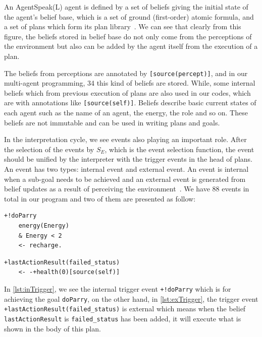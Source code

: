 An AgentSpeak(L) agent is defined by a set of beliefs giving the initial state of the agent's belief base, which is a set of ground (first-order) atomic formula, and a set of plans which form its plan library~\cite{rafael_BDIAgent_2005}.
We can see that clearly from this figure, the beliefs stored in belief base do not only come from the perceptions of the environment but also can be added by the agent itself from the execution of a plan.

The beliefs from perceptions are annotated by \texttt{[source(percept)]}, and in our multi-agent programming, 34 this kind of beliefs are stored.
While, some internal beliefs which from previous execution of plans are also used in our codes, which are with annotations like \texttt{[source(self)]}.
Beliefs describe basic current states of each agent such as the name of an agent, the energy, the role and so on.
These beliefs are not immutable and can be used in writing plans and goals.

In the interpretation cycle, we see events also playing an important role.
After the selection of the events by $S_E$, which is the event selection function, the event should be unified by the interpreter with the trigger events in the head of plans.
An event has two types: internal event and external event.
An event is internal when a sub-goal needs to be achieved and an external event is generated from belief updates as a result of perceiving the environment~\cite{rafael_Javabased_2007}.
We have 88 events in total in our program and two of them are presented as follow:

\begin{lstlisting}[caption={Internal Trigger Event.},label={lst:inTrigger}]
  +!doParry
    energy(Energy)
    & Energy < 2
    <- recharge.
\end{lstlisting}

\begin{lstlisting}[caption={External Trigger Event.},label={lst:exTrigger}]
  +lastActionResult(failed_status)
    <- -+health(0)[source(self)]
\end{lstlisting}

In \autoref{lst:inTrigger}, we see the internal trigger event \texttt{+!doParry} which is for achieving the goal \texttt{doParry}, on the other hand, in \autoref{lst:exTrigger}, the trigger event \texttt{+lastActionResult(failed\_status)} is external which means when the belief \texttt{ lastActionResult} is \texttt{failed\_status} has been added, it will execute what is shown in the body of this plan.

